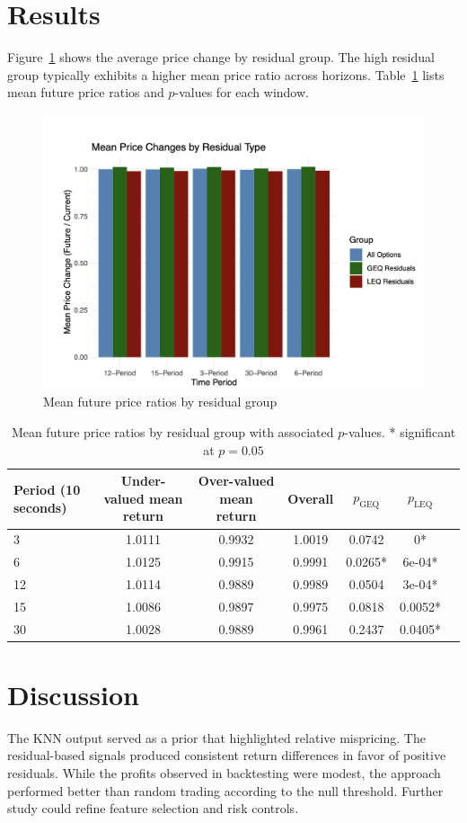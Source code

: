 \documentclass{article}
\begin{document}
\section{Results}
Figure~\ref{fig:price-diff} shows the average price change by residual group. The high residual group typically exhibits a higher mean price ratio across horizons. Table~\ref{tab:mean-return} lists mean future price ratios and $p$-values for each window.
\begin{figure}[h]
  \centering
  \includegraphics[width=0.8\linewidth]{data/results/mean_price_diff.png}
  \caption{Mean future price ratios by residual group}
  \label{fig:price-diff}
\end{figure}
\begin{table}[h]
  \centering
  \begin{tabular}{lcccccc}
    \toprule
    Period (10 seconds) & Under-valued mean return & Over-valued mean return & Overall & $p_{\text{GEQ}}$ & $p_{\text{LEQ}}$ \\
    \midrule
    3  & 1.0111 & 0.9932 & 1.0019 & 0.0742 & 0*     \\
    6  & 1.0125 & 0.9915 & 0.9991 & 0.0265* & 6e-04* \\
    12 & 1.0114 & 0.9889 & 0.9989 & 0.0504 & 3e-04* \\
    15 & 1.0086 & 0.9897 & 0.9975 & 0.0818 & 0.0052* \\
    30 & 1.0028 & 0.9889 & 0.9961 & 0.2437 & 0.0405* \\
    \bottomrule
  \end{tabular}
  \caption{Mean future price ratios by residual group with associated $p$-values. * significant at $p=0.05$}
  \label{tab:mean-return}
\end{table}
\section{Discussion}
The KNN output served as a prior that highlighted relative mispricing. The residual-based signals produced consistent return differences in favor of positive residuals. While the profits observed in backtesting were modest, the approach performed better than random trading according to the null threshold. Further study could refine feature selection and risk controls.
\end{document}
